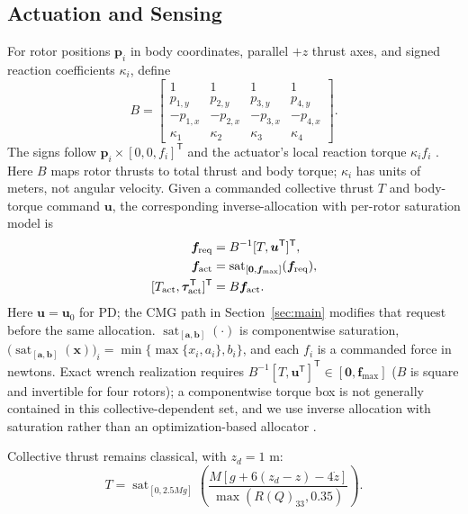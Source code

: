 \documentclass[letterpaper, 10 pt, conference]{ieeeconf}
\newcommand{\T}{^{\mathsf T}}
\newcommand{\sat}{\operatorname{sat}}
\begin{document}
\subsection{Actuation and Sensing}
%
For rotor positions $\bm p_i$ in body coordinates, parallel $+z$ thrust
axes, and signed reaction coefficients $\kappa_i$, define
\begin{equation}
 B=\begin{bmatrix}
 1&1&1&1\\p_{1,y}&p_{2,y}&p_{3,y}&p_{4,y}\\
 -p_{1,x}&-p_{2,x}&-p_{3,x}&-p_{4,x}\\
 \kappa_1&\kappa_2&\kappa_3&\kappa_4
 \end{bmatrix}.
 \label{eq:allocationmatrix}
\end{equation}
The signs follow $\bm p_i\times[0,0,f_i]\T$ and the actuator's local reaction torque $\kappa_i f_i$ \cite{garciacarrillo2013quad}. Here $B$ maps rotor thrusts to total thrust and body torque; $\kappa_i$ has units of meters, not angular velocity. Given a commanded collective thrust $T$ and body-torque command $\bm u$, the corresponding inverse-allocation with per-rotor saturation model is
\begin{equation}
 \begin{aligned}
 \bm f_{\rm req}&=B^{-1}[T,\bm u\T]\T,\\
 \bm f_{\rm act}&=\sat_{[\bm0,\bm f_{\max}]}(\bm f_{\rm req}),\\
 [T_{\rm act},\bm\tau_{\rm act}\T]\T&=B\bm f_{\rm act}.
 \end{aligned}
 \label{eq:mixer}
\end{equation}
Here $\bm u=\bm u_0$ for PD; the CMG path in Section~\ref{sec:main}
modifies that request before the same allocation.
$\sat_{[\bm a,\bm b]}(\cdot)$ is componentwise saturation,
$\bigl(\sat_{[\bm a,\bm b]}(\bm x)\bigr)_i=\min\{\max\{x_i,a_i\},b_i\}$, and each $f_i$ is a commanded force in newtons.
Exact wrench realization requires $B^{-1}[T,\bm u\T]\T\in[\bm0,\bm f_{\max}]$ ($B$ is square and invertible for four rotors); a componentwise torque box is not generally contained in this
collective-dependent set, and we use inverse allocation with saturation rather than an optimization-based allocator \cite{monteiro2016allocation}.

Collective thrust remains classical, with $z_d=1$ m:
\begin{equation}
 T=\sat_{[0,2.5Mg]}
 \left(\frac{M[g+6(z_d-z)-4\dot z]}{\max(R(Q)_{33},0.35)}\right).
 \label{eq:collective}
\end{equation}
\end{document}
